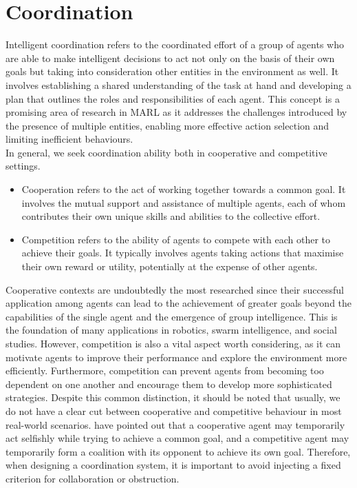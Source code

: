 \documentclass[a4paper,singleside,12pt]{report} %
\begin{document}
\section{Coordination}\label{coordination}

Intelligent coordination refers to the coordinated effort of a group of agents who are able to make intelligent decisions to act not only on the basis of their own goals but taking into consideration other entities in the environment as well. It involves establishing a shared understanding of the task at hand and developing a plan that outlines the roles and responsibilities of each agent. This concept is a promising area of research in MARL as it addresses the challenges introduced by the presence of multiple entities, enabling more effective action selection and limiting inefficient behaviours.\\
In general, we seek coordination ability both in cooperative and competitive settings.

\begin{itemize}
    \item Cooperation refers to the act of working together towards a common goal. It involves the mutual support and assistance of multiple agents, each of whom contributes their own unique skills and abilities to the collective effort.
    \item Competition refers to the ability of agents to compete with each other to achieve their goals. It typically involves agents taking actions that maximise their own reward or utility, potentially at the expense of other agents.
\end{itemize}

Cooperative contexts are undoubtedly the most researched \cite{Cao2012AnOO} since their successful application among agents can lead to the achievement of greater goals beyond the capabilities of the single agent and the emergence of group intelligence. This is the foundation of many applications in robotics, swarm intelligence, and social studies. However, competition is also a vital aspect worth considering, as it can motivate agents to improve their performance and explore the environment more efficiently. Furthermore, competition can prevent agents from becoming too dependent on one another and encourage them to develop more sophisticated strategies. Despite this common distinction, it should be noted that usually, we do not have a clear cut between cooperative and competitive behaviour in most real-world scenarios. \cite{Buoniu2008ACS, Hoen2005AnOO} have pointed out that a cooperative agent may temporarily act selfishly while trying to achieve a common goal, and a competitive agent may temporarily form a coalition with its opponent to achieve its own goal. Therefore, when designing a coordination system, it is important to avoid injecting a fixed criterion for collaboration or obstruction.
\end{document}
